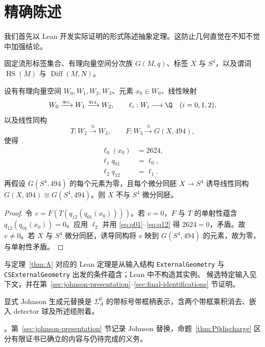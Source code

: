 \section{精确陈述}

我们首先以 Lean 开发实际证明的形式陈述抽象定理。这防止几何直觉在不知不觉中加强结论。

固定流形标签集合、有理向量空间分次族 $G(M,q)$、标签 $X$ 与 $S^4$，以及谓词
\(\operatorname{HS}(M)\) 与 \(\operatorname{Diff}(M,N)\)。

\begin{theorem}[抽象非标准性定理]\label{thm:A}
设有有理向量空间 $W_0,W_1,W_2,W_3$、元素 $x_0\in W_0$、线性映射
\[
W_0\xrightarrow{q_{01}}W_1\xrightarrow{q_{12}}W_2,
\qquad
\ell_i:W_i\longrightarrow\Q\quad (i=0,1,2),
\]
以及线性同构
\[
T:W_2\xrightarrow{\cong}W_3,
\qquad
F:W_3\xrightarrow{\cong}G(X,494),
\]
使得
\begin{align}
\ell_0(x_0)&=2624,\label{eq:value}\\
\ell_1q_{01}&=\ell_0,\label{eq:q01}\\
\ell_2q_{12}&=\ell_1.\label{eq:q12}
\end{align}
再假设 $G(S^4,494)$ 的每个元素为零，且每个微分同胚 $X\to S^4$ 诱导线性同构
\(G(X,494)\cong G(S^4,494)\)。则 $X$ 不与 $S^4$ 微分同胚。
\end{theorem}

\begin{proof}
令 $v=F(T(q_{12}(q_{01}(x_0))))$。若 $v=0$，$F$ 与 $T$ 的单射性蕴含 $q_{12}(q_{01}(x_0))=0$。应用 $\ell_2$ 并用 \eqref{eq:q01}--\eqref{eq:q12} 得 $2624=0$，矛盾。故 $v\ne0$。若 $X$ 与 $S^4$ 微分同胚，诱导同构将 $v$ 映到 $G(S^4,494)$ 的元素，故为零，与单射性矛盾。
\end{proof}

与定理~\ref{thm:A} 对应的 Lean 定理是从输入结构 \texttt{ExternalGeometry} 与
\texttt{CSExternalGeometry} 出发的条件蕴含；Lean 中不构造其实例。
候选特定输入见下文，并在第~\ref{sec:johnson-presentation}--\ref{sec:final-identifications} 节证明。

\begin{hypothesis}[嵌入候选表示，P0]\label{hyp:P0}
显式 Johnson 生成元替换是 $\Sigma_A^0$ 的带标号带框柄表示，含两个带框乘积消去、嵌入 detector 球及所述缆附着。
\end{hypothesis}

\begin{remark}[P0 的状态]
\Open。第~\ref{sec:johnson-presentation} 节记录 Johnson 替换，命题~\ref{thm:P0discharge} 区分有限证书已确立的内容与仍待完成的义务。
\end{remark}

